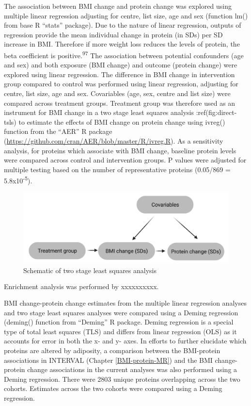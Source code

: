 \documentclass[11pt,twoside]{bristolthesis}
\begin{document}
The association between BMI change and protein change was explored using multiple linear regression adjusting for centre, list size, age and sex (function lm() from base R ``stats'' package). Due to the nature of linear regression, outputs of regression provide the mean individual change in protein (in SDs) per SD increase in BMI. Therefore if more weight loss reduces the levels of protein, the beta coefficient is positive.\textsuperscript{97} The association between potential confounders (age and sex) and both exposure (BMI change) and outcome (protein change) were explored using linear regression. The difference in BMI change in intervention group compared to control was performed using linear regression, adjusting for centre, list size, age and sex. Covariables (age, sex, centre and list size) were compared across treatment groups. Treatment group was therefore used as an instrument for BMI change in a two stage least squares analysis :ref(fig:direct-tsls) to estimate the effects of BMI change on protein change using ivreg() function from the ``AER'' R package (\url{https://github.com/cran/AER/blob/master/R/ivreg.R}). As a sensitivity analysis, for proteins which associate with BMI change, baseline protein levels were compared across control and intervention groups. P values were adjusted for multiple testing based on the number of representative proteins (0.05/869 = 5.8x10\textsuperscript{-5}).



\begin{figure}
\includegraphics{figure/DiRECT/DiRECT_analysis} \caption[Schematic of two stage least squares analysis]{Schematic of two stage least squares analysis}\label{fig:direct-tsls}
\end{figure}
Enrichment analysis was performed by xxxxxxxxxx.

BMI change-protein change estimates from the multiple linear regression analyses and two stage least squares analyses were compared using a Deming regression (deming() function from ``Deming'' R package. Deming regression is a special type of total least squares (TLS) and differs from linear regression (OLS) as it accounts for error in both the x- and y- axes. In efforts to further elucidate which proteins are altered by adiposity, a comparison between the BMI-protein associations in INTERVAL (Chapter \ref{BMI-protein-MR}) and the BMI change-protein change associations in the current analyses was also performed using a Deming regression. There were 2803 unique proteins overlapping across the two cohorts. Estimates across the two cohorts were compared using a Deming regression.
\end{document}
